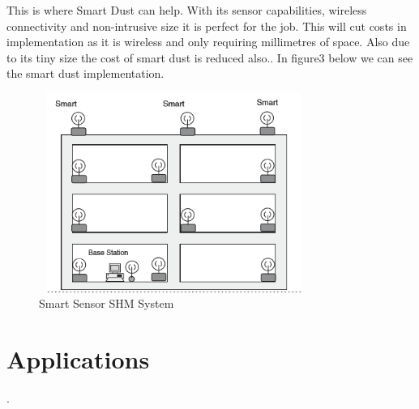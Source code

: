 \documentclass[article]{IEEEtran}
\begin{document}
This is where Smart Dust can help. With its sensor capabilities, wireless connectivity and non-intrusive size it is perfect for the job. This will cut costs in implementation as it is wireless and only requiring millimetres of space. Also due to its tiny size the cost of smart dust is reduced also.\cite{SHM}. In figure3 below we can see the smart dust implementation.

\begin{figure}[h!]
\graphicspath{ {images/} }
\includegraphics[width=8.8cm, height=6.5cm]{figure3}
\caption{Smart Sensor SHM System}
\label{Smart Sensor System SHM}
\end{figure}

\section{Applications}.\newline

\listoffigures
\printbibliography
\end{document}
